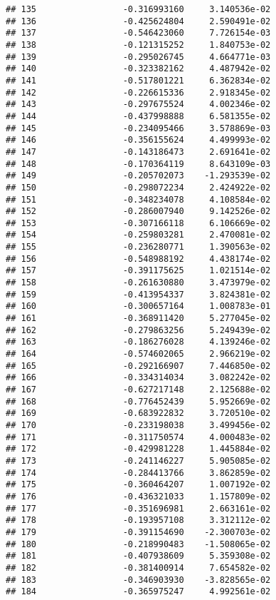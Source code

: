 \documentclass[
]{article}
\begin{document}
\begin{verbatim}
## 135                 -0.316993160     3.140536e-02
## 136                 -0.425624804     2.590491e-02
## 137                 -0.546423060     7.726154e-03
## 138                 -0.121315252     1.840753e-02
## 139                 -0.295026745     4.664771e-03
## 140                 -0.323382162     4.487942e-02
## 141                 -0.517801221     6.362834e-02
## 142                 -0.226615336     2.918345e-02
## 143                 -0.297675524     4.002346e-02
## 144                 -0.437998888     6.581355e-02
## 145                 -0.234095466     3.578869e-03
## 146                 -0.356155624     4.499993e-02
## 147                 -0.143186473     2.691641e-02
## 148                 -0.170364119     8.643109e-03
## 149                 -0.205702073    -1.293539e-02
## 150                 -0.298072234     2.424922e-02
## 151                 -0.348234078     4.108584e-02
## 152                 -0.286007940     9.142526e-02
## 153                 -0.307166118     6.106669e-02
## 154                 -0.259803281     2.470081e-02
## 155                 -0.236280771     1.390563e-02
## 156                 -0.548988192     4.438174e-02
## 157                 -0.391175625     1.021514e-02
## 158                 -0.261630880     3.473979e-02
## 159                 -0.413954337     3.824381e-02
## 160                 -0.300657164     1.008783e-01
## 161                 -0.368911420     5.277045e-02
## 162                 -0.279863256     5.249439e-02
## 163                 -0.186276028     4.139246e-02
## 164                 -0.574602065     2.966219e-02
## 165                 -0.292166907     7.446850e-02
## 166                 -0.334314034     3.082242e-02
## 167                 -0.627217148     2.125688e-02
## 168                 -0.776452439     5.952669e-02
## 169                 -0.683922832     3.720510e-02
## 170                 -0.233198038     3.499456e-02
## 171                 -0.311750574     4.000483e-02
## 172                 -0.429981228     1.445884e-02
## 173                 -0.241146227     5.905085e-02
## 174                 -0.284413766     3.862859e-02
## 175                 -0.360464207     1.007192e-02
## 176                 -0.436321033     1.157809e-02
## 177                 -0.351696981     2.663161e-02
## 178                 -0.193957108     3.312112e-02
## 179                 -0.391154690    -2.300703e-02
## 180                 -0.218990483    -1.508065e-02
## 181                 -0.407938609     5.359308e-02
## 182                 -0.381400914     7.654582e-02
## 183                 -0.346903930    -3.828565e-02
## 184                 -0.365975247     4.992561e-02

\end{verbatim}
\end{document}
